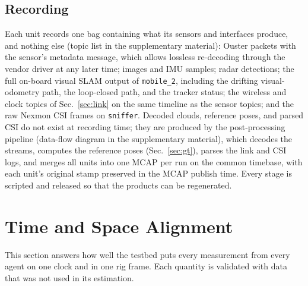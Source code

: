 \documentclass[journal]{IEEEtran}
\begin{document}
\subsection{Recording}
\label{sec:recording}
Each unit records one bag containing what its sensors and interfaces
produce, and nothing else (topic list in the supplementary material): Ouster packets
with the sensor's metadata message, which allows lossless re-decoding
through the vendor driver at any later time; images and IMU samples;
radar detections; the full on-board visual SLAM output of
\texttt{mobile\_2}, including the drifting visual-odometry path, the
loop-closed path, and the tracker status; the wireless and clock topics
of Sec.~\ref{sec:link} on the same timeline as the sensor topics; and
the raw Nexmon CSI frames on \texttt{sniffer}. Decoded clouds,
reference poses, and parsed CSI do not exist at recording time; they
are produced by the post-processing pipeline (data-flow diagram in the
supplementary material), which decodes the streams, computes the reference poses
(Sec.~\ref{sec:gt}), parses the link and CSI logs, and merges all units
into one MCAP per run on the common timebase, with each unit's original
stamp preserved in the MCAP publish time. Every stage is scripted and
released so that the products can be regenerated.


\section{Time and Space Alignment}
\label{sec:alignment}
This section answers how well the testbed puts every measurement from
every agent on one clock and in one rig frame. Each quantity is
validated with data that was not used in its estimation.
\end{document}
